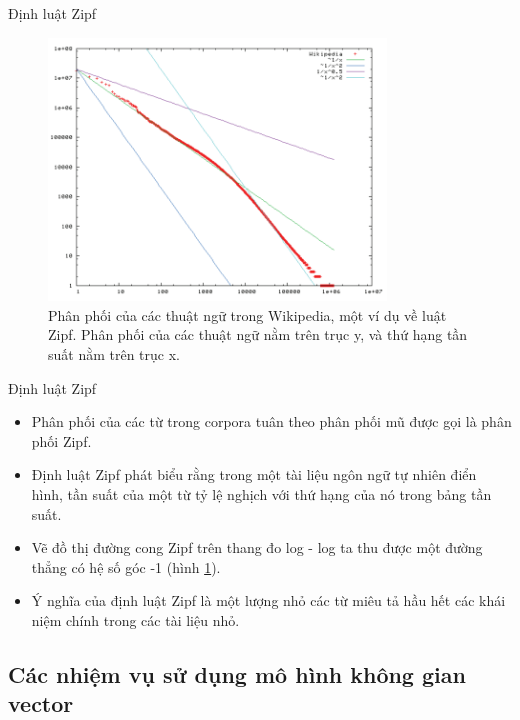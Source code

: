\documentclass[10pt]{beamer}
\theoremstyle{remark}
\theoremstyle{definition}
\begin{document}
\begin{frame}{Định luật Zipf}
	\begin{figure}[h!]
        \centering
        \includegraphics[width=0.8\textwidth]{2.png}
        \caption{Phân phối của các thuật ngữ trong Wikipedia, một ví dụ về luật Zipf.
        Phân phối của các thuật ngữ nằm trên trục y, và thứ hạng tần suất nằm trên trục x.}
        \label{fig:2}
    \end{figure}

\end{frame}

\begin{frame}{Định luật Zipf}
	\begin{itemize}
		\item Phân phối của các từ trong corpora tuân theo phân phối mũ được gọi là phân phối Zipf.
		\item Định luật Zipf \cite{490} phát biểu rằng trong một tài liệu ngôn ngữ tự nhiên điển hình, tần suất của một từ tỷ lệ nghịch với thứ hạng của nó trong bảng tần suất.
		\item Vẽ đồ thị đường cong Zipf trên thang đo log - log ta thu được một đường thẳng có hệ số góc -1 (hình \ref{fig:2}).
		\item Ý nghĩa của định luật Zipf là một lượng nhỏ các từ miêu tả hầu hết các khái niệm chính trong các tài liệu nhỏ.
	\end{itemize}
\end{frame}

\subsection{Các nhiệm vụ sử dụng mô hình không gian vector}
\end{document}
